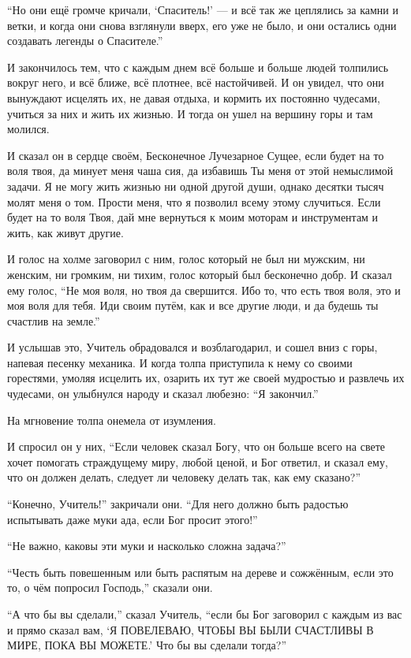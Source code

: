 ``Но они ещё громче кричали, `Спаситель!' --- и всё так же цеплялись за камни и ветки, и когда они снова взглянули вверх, его уже не было, и они остались одни создавать легенды о Спасителе.''

И закончилось тем, что с каждым днем всё больше и больше людей толпились вокруг него, и всё ближе,
всё плотнее, всё настойчивей. И он увидел, что они вынуждают исцелять их, не давая отдыха, и кормить их постоянно чудесами, учиться за них и жить их жизнью. И тогда он ушел на вершину горы и там молился.

И сказал он в сердце своём, Бесконечное Лучезарное Сущее, если будет на то воля твоя, да минует меня чаша сия, да избавишь Ты меня от этой немыслимой задачи. Я не могу жить жизнью ни одной другой души, однако десятки тысяч молят меня о том. Прости меня, что я позволил всему этому случиться. Если будет на то воля Твоя, дай мне вернуться к моим моторам и инструментам и жить, как живут другие.

И голос на холме заговорил с ним, голос который не был ни мужским, ни женским, ни громким, ни тихим, голос который был бесконечно добр. И сказал ему голос, ``Не моя воля, но твоя да свершится. Ибо то, что есть твоя воля, это и моя воля для тебя. Иди своим путём, как и все другие люди, и да будешь ты счастлив на земле.''

И услышав это, Учитель обрадовался и возблагодарил, и сошел вниз с горы, напевая песенку
механика. И когда толпа приступила к нему со своими горестями, умоляя исцелить их, озарить их тут
же своей мудростью и развлечь их чудесами, он улыбнулся народу и сказал любезно: ``Я закончил.''

На мгновение толпа онемела от изумления.

И спросил он у них, ``Если человек сказал Богу, что он больше всего на свете хочет помогать страждущему миру, любой ценой, и Бог ответил, и сказал ему, что он должен делать, следует ли человеку делать так, как ему сказано?''

``Конечно, Учитель!'' закричали они. ``Для него должно быть радостью испытывать даже муки ада, если Бог просит этого!''

``Не важно, каковы эти муки и насколько сложна задача?''

``Честь быть повешенным или быть распятым на дереве и сожжённым, если это то, о чём попросил
 Господь,'' сказали они.

``А что бы вы сделали,'' сказал Учитель, ``если бы Бог заговорил с каждым из вас и прямо сказал вам, `Я ПОВЕЛЕВАЮ, ЧТОБЫ ВЫ БЫЛИ СЧАСТЛИВЫ В МИРЕ, ПОКА ВЫ МОЖЕТЕ.' Что бы вы сделали тогда?''

